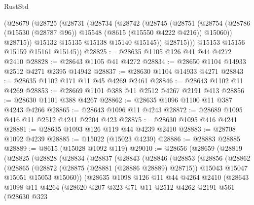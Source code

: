 \begin{lexlean}{RustStd}
\begin{coremodule}
        (@28679
          (@28725
            (@28731
              (@28734
                (@28742
                  (@28745
                    (@28751
                      (@28754
                        (@28786 (@15530 (@28787 @96)) @15548 (@8615 (@15550 @4222 @4216)) @15060))
                      @28715))
                  @15132
                  @15135
                  @15138
                  @15140
                  @15145))
              @28715)))
        @15153
        @15156
        @15159
        @15161
        @15145))
@28825 := @28635 @1105 @126 @41 @44 @4272 @2410
@28828 := @28643 @1105 @41 @4272
@28834 := @28650 @1104 @14933 @2512 @4271 @2395 @14942
@28837 := @28630 @1104 @14933 @4271
@28843 := @28635 @1102 @171 @11 @45 @4269 @2461
@28846 := @28643 @1102 @11 @4269
@28853 := @28669 @1101 @388 @11 @2512 @4267 @2191 @413
@28856 := @28630 @1101 @388 @4267
@28862 := @28635 @1096 @1100 @11 @387 @4243 @4266
@28865 := @28643 @1096 @11 @4243
@28872 := @28689 @1095 @416 @11 @2512 @4241 @2204 @423
@28875 := @28630 @1095 @416 @4241
@28881 := @28635 @1093 @126 @119 @44 @4239 @2410
@28883 := @28708 @1092 @4239
@28885 := @15022 (@15023 @4239)
@28886 := @28883 @28885
@28889 := @8615 (@15028 @1092 @119)
@29010 := @28656
    (@28659
      (@28819
        (@28825
          (@28828
            (@28834
              (@28837
                (@28843
                  (@28846
                    (@28853
                      (@28856
                        (@28862
                          (@28865
                            (@28872
                              (@28875 (@28881 (@28886 @28889) @28715))
                              @15043
                              @15047
                              @15051
                              @15053
                              @15060))
                          (@28635
                            @1098
                            @126
                            @11
                            @44
                            @4264
                            @2410
                            (@28643
                              @1098
                              @11
                              @4264
                              (@28620
                                @207
                                @323
                                @71
                                @11
                                @2512
                                @4262
                                @2191
                                @561
                                (@28630
                                  @323

\end{coremodule}
\end{lexlean}
